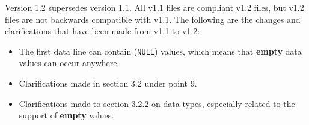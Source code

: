 Version 1.2 supersedes version 1.1. All v1.1 files are compliant v1.2 files,
but v1.2 files are not backwards compatible with v1.1. The following are the
changes and clarifications that have been made from v1.1 to v1.2:

\begin{itemize}
\item The first data line can contain (\texttt{\small NULL}) values, which
  means that \textbf{empty} data values can occur anywhere.
\item Clarifications made in section 3.2 under point 9.
\item Clarifications made to section 3.2.2 on data types, especially related
  to the support of \textbf{empty} values.
\end{itemize}
